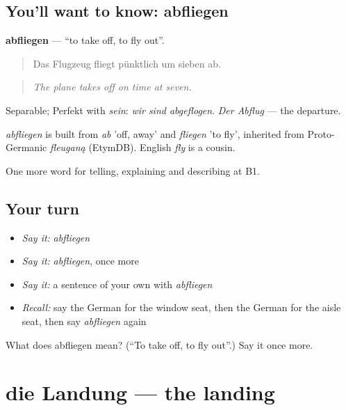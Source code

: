 \subsection*{You'll want to know: abfliegen}
\textbf{abfliegen} — \textquotedblleft{}to take off, to fly out\textquotedblright{}.

\begin{quote}
Das Flugzeug fliegt pünktlich um sieben ab.
\end{quote}

\begin{quote}
\emph{The plane takes off on time at seven.}
\end{quote}

Separable; Perfekt with \emph{sein}: \emph{wir sind abgeflogen}. \emph{Der Abflug} — the departure.

\begin{cousinweb}
\emph{abfliegen} is built from \emph{ab} 'off, away' and \emph{fliegen} 'to fly', inherited from Proto-Germanic \emph{fleuganą} (EtymDB). English \emph{fly} is a cousin.
\end{cousinweb}

\begin{grammarlens}[title={What you've built}]
One more word for telling, explaining and describing at B1.
\end{grammarlens}

\subsection*{Your turn}
\begin{itemize}
\raggedright
  \item \emph{Say it:} \emph{abfliegen}
  \item \emph{Say it:} \emph{abfliegen}, once more
  \item \emph{Say it:} a sentence of your own with \emph{abfliegen}
  \item \emph{Recall:} say the German for the window seat, then the German for the aisle seat, then say \emph{abfliegen} again
\end{itemize}

\begin{tcolorbox}[breakable,colback=teal!4,colframe=teal!35!black,title={Before you move on}]
What does abfliegen mean? (\textquotedblleft{}To take off, to fly out\textquotedblright{}.) Say it once more.
\end{tcolorbox}
\section[die Landung]{die Landung — the landing}

